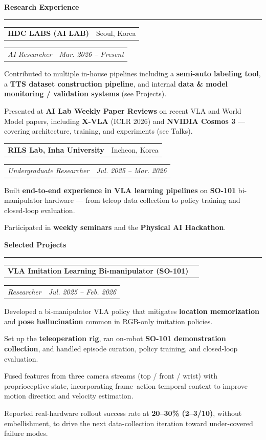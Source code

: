 \documentclass[10pt,a4paper]{article}
\makeatletter
\renewcommand{\section}[1]{%
  \par\vspace{10pt}%
  {\color{accent}\Large\bfseries #1}%
  \par\vspace{-6pt}%
  {\color{accent}\rule{\textwidth}{0.8pt}}%
  \par\vspace{4pt}%
  \@afterheading}
\newcommand{\cvEntry}[4]{%
  \par\vspace{3pt}%
  \noindent\begin{tabularx}{\textwidth}{@{}X r@{}}
    \textbf{#1} & {\color{accent}#2} \\
  \end{tabularx}\par\vspace{-4pt}%
  \noindent\begin{tabularx}{\textwidth}{@{}X r@{}}
    \textit{#3} & {\color{accent}\textit{#4}} \\
  \end{tabularx}\par}
\newenvironment{cvitems}{%
  \vspace{-2pt}%
  \begin{list}{\textbullet}{%
    \setlength{\leftmargin}{1.4em}%
    \setlength{\rightmargin}{0em}%
    \setlength{\topsep}{1pt}%
    \setlength{\itemsep}{2pt}%
    \setlength{\parsep}{0pt}%
    \setlength{\labelsep}{0.6em}}%
}{\end{list}\vspace{2pt}}
\makeatother
\begin{document}
\section{Research Experience}

\cvEntry{HDC LABS (AI LAB)}{Seoul, Korea}{AI Researcher}{Mar. 2026 -- Present}
\begin{cvitems}
  \item Contributed to multiple in-house pipelines including a \textbf{semi-auto labeling tool}, a \textbf{TTS dataset construction pipeline}, and internal \textbf{data \& model monitoring / validation systems} (see Projects).
  \item Presented at \textbf{AI Lab Weekly Paper Reviews} on recent VLA and World Model papers, including \textbf{X-VLA} (ICLR 2026) and \textbf{NVIDIA Cosmos 3} --- covering architecture, training, and experiments (see Talks).
\end{cvitems}

\vspace{4pt}
\cvEntry{RILS Lab, Inha University}{Incheon, Korea}{Undergraduate Researcher \quad {\small (Advised by Prof.\ Woojin Ahn)}}{Jul. 2025 -- Mar. 2026}
\begin{cvitems}
  \item Built \textbf{end-to-end experience in VLA learning pipelines} on \textbf{SO-101} bi-manipulator hardware --- from teleop data collection to policy training and closed-loop evaluation.
  \item Participated in \textbf{weekly seminars} and the \textbf{Physical AI Hackathon}.
\end{cvitems}

\section{Selected Projects}

\cvEntry{VLA Imitation Learning Bi-manipulator (SO-101)}{}{Researcher \quad {\small @ RILS Lab}}{Jul. 2025 -- Feb. 2026}
\begin{cvitems}
  \item Developed a bi-manipulator VLA policy that mitigates \textbf{location memorization} and \textbf{pose hallucination} common in RGB-only imitation policies.
  \item Set up the \textbf{teleoperation rig}, ran on-robot \textbf{SO-101 demonstration collection}, and handled episode curation, policy training, and closed-loop evaluation.
  \item Fused features from three camera streams (top / front / wrist) with proprioceptive state, incorporating frame--action temporal context to improve motion direction and velocity estimation.
  \item Reported real-hardware rollout success rate at \textbf{20--30\% (2--3/10)}, without embellishment, to drive the next data-collection iteration toward under-covered failure modes.
\end{cvitems}
\end{document}
